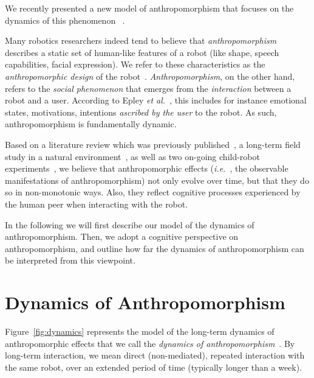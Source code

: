 \documentclass{sig-alternate-2013}
\newcommand{\etal}{{\textit{et al.~}}}
\newcommand{\ie}{{\textit{i.e.~}}}
\begin{document}
We recently presented a new model of anthropomorphism that focuses on the
dynamics of this phenomenon ~\cite{lemaignan2014dynamics}.

Many robotics researchers indeed tend to believe that \emph{anthropomorphism}
describes a static set of human-like features of a robot (like shape, speech
capabilities, facial expression). We refer to these characteristics as the
\emph{anthropomorphic design} of the robot~\cite{fink_anthropomorphism_2012}.
\emph{Anthropomorphism}, on the other hand, refers to the \emph{social
phenomenon} that emerges from the \emph{interaction} between a robot and a
user. According to Epley \etal\cite{epley_when_2008}, this includes for
instance emotional states, motivations, intentions \emph{ascribed by the user}
to the robot. As such, anthropomorphism is fundamentally dynamic.

Based on a literature review which was previously
published~\cite{fink_anthropomorphism_2012}, a long-term field study in a
natural environment~\cite{fink_living_2013}, as well as two on-going child-robot
experiments~\cite{fink2014which}, we believe that anthropomorphic effects
(\ie, the observable manifestations of anthropomorphism) not only evolve over
time, but that they do so in non-monotonic ways. Also, they reflect cognitive
processes experienced by the human peer when interacting with the robot.

In the following we will first describe our model of the dynamics of anthropomorphism.
Then, we adopt a cognitive perspective on anthropomorphism, and outline how far 
the dynamics of anthropomorphism can be interpreted from this viewpoint. 


\section{Dynamics of Anthropomorphism}
\label{sec:dynamics_model}

Figure~\ref{fig:dynamics} represents the model of the long-term dynamics of
anthropomorphic effects that we call the \emph{dynamics of
anthropomorphism}~\cite{lemaignan2014dynamics}. By long-term interaction, we mean
direct (non-mediated), repeated interaction with the same robot, over an
extended period of time (typically longer than a week).
\end{document}
